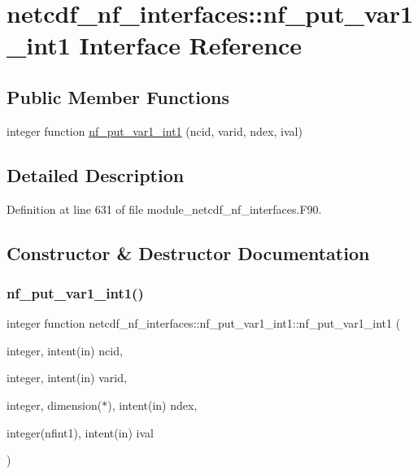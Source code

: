 \hypertarget{interfacenetcdf__nf__interfaces_1_1nf__put__var1__int1}{}\section{netcdf\+\_\+nf\+\_\+interfaces\+:\+:nf\+\_\+put\+\_\+var1\+\_\+int1 Interface Reference}
\label{interfacenetcdf__nf__interfaces_1_1nf__put__var1__int1}
\subsection*{Public Member Functions}
\begin{DoxyCompactItemize}
\item 
integer function \hyperlink{interfacenetcdf__nf__interfaces_1_1nf__put__var1__int1_a81cc2433f9364f7e9abca491b4389d4f}{nf\+\_\+put\+\_\+var1\+\_\+int1} (ncid, varid, ndex, ival)
\end{DoxyCompactItemize}


\subsection{Detailed Description}


Definition at line 631 of file module\+\_\+netcdf\+\_\+nf\+\_\+interfaces.\+F90.



\subsection{Constructor \& Destructor Documentation}
\mbox{\label{interfacenetcdf__nf__interfaces_1_1nf__put__var1__int1_a81cc2433f9364f7e9abca491b4389d4f}} 
\subsubsection{\texorpdfstring{nf\+\_\+put\+\_\+var1\+\_\+int1()}{nf\_put\_var1\_int1()}}
{\footnotesize\ttfamily integer function netcdf\+\_\+nf\+\_\+interfaces\+::nf\+\_\+put\+\_\+var1\+\_\+int1\+::nf\+\_\+put\+\_\+var1\+\_\+int1 (\begin{DoxyParamCaption}\item[{integer, intent(in)}]{ncid,  }\item[{integer, intent(in)}]{varid,  }\item[{integer, dimension($\ast$), intent(in)}]{ndex,  }\item[{integer(nfint1), intent(in)}]{ival }\end{DoxyParamCaption})}



